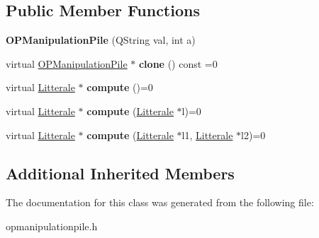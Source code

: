 \subsection*{Public Member Functions}
\begin{DoxyCompactItemize}
\item 
{\bfseries O\+P\+Manipulation\+Pile} (Q\+String val, int a)\hypertarget{class_o_p_manipulation_pile_a359e8ef737c1b4f312e351d7b401edef}{}\label{class_o_p_manipulation_pile_a359e8ef737c1b4f312e351d7b401edef}

\item 
virtual \hyperlink{class_o_p_manipulation_pile}{O\+P\+Manipulation\+Pile} $\ast$ {\bfseries clone} () const  =0\hypertarget{class_o_p_manipulation_pile_ac67c53b033b086749a6da773093fb9ea}{}\label{class_o_p_manipulation_pile_ac67c53b033b086749a6da773093fb9ea}

\item 
virtual \hyperlink{class_litterale}{Litterale} $\ast$ {\bfseries compute} ()=0\hypertarget{class_o_p_manipulation_pile_a9b1b4774ca2d3561a64a9c7bdb0c29ca}{}\label{class_o_p_manipulation_pile_a9b1b4774ca2d3561a64a9c7bdb0c29ca}

\item 
virtual \hyperlink{class_litterale}{Litterale} $\ast$ {\bfseries compute} (\hyperlink{class_litterale}{Litterale} $\ast$l)=0\hypertarget{class_o_p_manipulation_pile_a689328e01162aca9bbf1f41173caf2b8}{}\label{class_o_p_manipulation_pile_a689328e01162aca9bbf1f41173caf2b8}

\item 
virtual \hyperlink{class_litterale}{Litterale} $\ast$ {\bfseries compute} (\hyperlink{class_litterale}{Litterale} $\ast$l1, \hyperlink{class_litterale}{Litterale} $\ast$l2)=0\hypertarget{class_o_p_manipulation_pile_a2113dd755fb0a10cc7ed64c0f37d256f}{}\label{class_o_p_manipulation_pile_a2113dd755fb0a10cc7ed64c0f37d256f}

\end{DoxyCompactItemize}
\subsection*{Additional Inherited Members}


The documentation for this class was generated from the following file\+:\begin{DoxyCompactItemize}
\item 
opmanipulationpile.\+h\end{DoxyCompactItemize}
